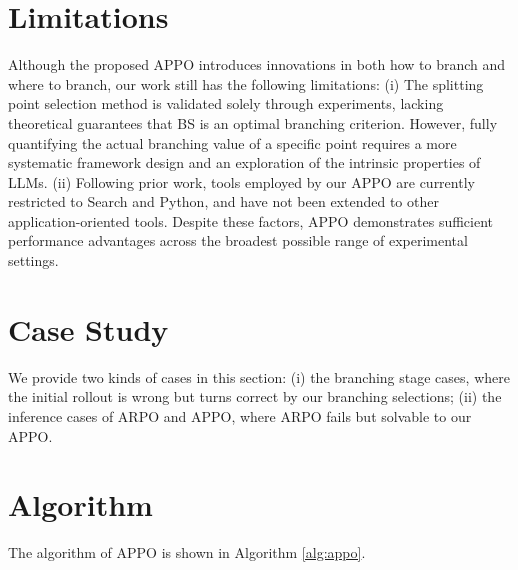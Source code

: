 \documentclass{article}
\begin{document}
\section{Limitations}\label{appx:g} 
Although the proposed APPO introduces innovations in both how to branch and where to branch, our work still has the following limitations: (i) The splitting point selection method is validated solely through experiments, lacking theoretical guarantees that BS is an optimal branching criterion. However, fully quantifying the actual branching value of a specific point requires a more systematic framework design and an exploration of the intrinsic properties of LLMs. (ii) Following prior work, tools employed by our APPO are currently restricted to Search and Python, and have not been extended to other application-oriented tools.
Despite these factors, APPO demonstrates sufficient performance advantages across the broadest possible range of experimental settings.

\section{Case Study}\label{appx:h}
We provide two kinds of cases in this section: (i) the branching stage cases, where the initial rollout is wrong but turns correct by our branching selections; (ii) the inference cases of ARPO and APPO, where ARPO fails but solvable to our APPO.   

\section{Algorithm}\label{appx:i}
The algorithm of APPO is shown in Algorithm \ref{alg:appo}.
\DontPrintSemicolon
{}
\SetAlCapSkip{0.5em}
\SetAlFnt{\small}
 
\end{document}
